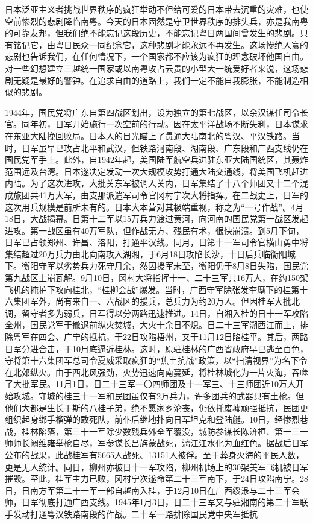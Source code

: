 日本泛亚主义者挑战世界秩序的疯狂举动不但给可爱的日本带去沉重的灾难，也使空前惨烈的悲剧降临南粤。今天的日本固然是守卫世界秩序的排头兵，亦是我南粤的可靠友邦，但我们绝不能忘记这段历史，不能忘记粤日两国间曾发生的悲剧。只有铭记它，由粤日民众一同纪念它，这种悲剧才能永远不再发生。这场惨绝人寰的悲剧也告诉我们，在任何情况下，一个国家都不应该为疯狂的理念破坏他国自由。对一些幻想建立三越统一国家或以南粤攻占云贵的小型大一统爱好者来说，这场悲剧无疑是最好的警钟。在追求自由的道路上，我们一定不能自我膨胀，不能制造相似的悲剧。

1944年，国民党将广东自第四战区划出，设为独立的第七战区，以余汉谋任司令长官。同年初，日军开始施行一次空前的行动。因在太平洋战场不断失利，日本谋求在东亚大陆挽回败局。日本人的目光瞄上了贯通大陆南北的粤汉、平汉铁路。当时，日军虽早已攻占北平和武汉，但铁路河南段、湖南段、广东段和广西支线仍在国民党军手上。此外，自1942年起，美国陆军航空兵进驻东亚大陆国统区，其轰炸范围远及台湾。日本遂决定发动一次大规模攻势打通大陆交通线，将美国飞机赶进内陆。为了这次进攻，大批关东军被调入关内，日军集结了十八个师团又十二个混成旅团共41万大军，由支那派遣军司令官冈村宁次大将指挥。在二战史上，日军的这次用兵规模是前所未有的。日本大本营对其极端重视，称之为“一号作战”。4月18日，大战揭幕。日第十二军以15万兵力渡过黄河，向河南的国民党第一战区发起进攻。第一战区虽有40万军队，但作战无方、残民有术，很快崩溃。到5月下旬，日军已占领郑州、许昌、洛阳，打通平汉线。同月，日第十一军司令官横山勇中将集结超过20万兵力由北向南攻入湖湘，于6月18日攻陷长沙，十日后兵临衡阳城下。衡阳守军以劣势兵力死守月余，然因援军未至，衡阳仍于8月8日失陷，国民党第九战区土崩瓦解。9月10日，冈村大将指挥十一、二十三军共16万人，在约150架飞机的掩护下攻向桂北，“桂柳会战”爆发。当时，广西守军除张发奎麾下的桂第十六集团军外，尚有来自一、六战区的援兵，总兵力为约20万人。但因桂军大批北调，留守者多为弱兵，日军得以分两路迅速推进。14日，自湘入桂的日十一军攻陷全州，国民党军于撤退前纵火焚城，大火十余日不熄。日二十三军溯西江而上，排除粤军在四会、广宁的抵抗，于22日攻陷梧州，又于11月12日陷桂平。其后，两路日军分进合击，于10月底逼近桂林。这时，原驻桂林的广西省政府早已逃至百色，守将第十六集团军总司令夏威采取疯狂的“焦土抗战”政策，以“扫清视界”为名下令在北郊纵火。由于西北风强劲，火势迅速向南蔓延，将桂林城化为一片火海，吞噬了大批军民。11月1日，日二十三军一〇四师团及十一军三、十三师团近10万人开始攻城。守城的桂三十一军和民团虽仅有2万兵力，许多团兵的武器只有土枪。但他们大都是生长于斯的八桂子弟，绝不愿家乡沦丧，仍依托废墟顽强抵抗，民团更组织起身绑手榴弹的敢死队，前仆后继地扑向日军坦克和登陆艇。10日，经惨烈巷战，桂林陷落，第三十一军除少数残兵外全军覆没，城防参谋长陈济桓、第一三一师师长阚维雍举枪自尽，军参谋长吕旃蒙战死，漓江江水化为血红色。据战后日军公布的战果，此战桂军有5665人战死、13151人被俘。至于葬身火海的平民人数，更是无人统计。同日，柳州亦被日十一军攻陷，柳州机场上的30架美军飞机被日军摧毁。至此，桂军主力已败，冈村宁次遂命第二十三军南下，于24日攻陷南宁。28日，日南方军第二十一军一部自越南入桂，于12月10日在广西绥淥与二十三军会师，日军彻底打通广西支线。1945年1月3日，日二十三军又与驻湘南的第二十军联手发动打通粤汉铁路南段的作战。二十军一路排除国民党中央军抵抗
